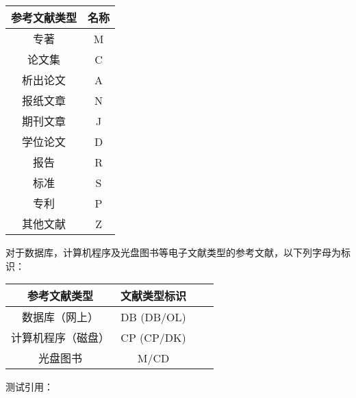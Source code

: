 \documentclass[12pt]{zjutbook}
\begin{document}
\begin{table}[htp]
  \centering
  \begin{tabular}{cc}
    \toprule
    \textbf{参考文献类型} & \textbf{名称} \\
    \midrule
    专著              & M           \\
    论文集             & C           \\
    析出论文            & A           \\
    报纸文章            & N           \\
    期刊文章            & J           \\
    学位论文            & D           \\
    报告              & R           \\
    标准              & S           \\
    专利              & P           \\
    其他文献            & Z           \\
    \bottomrule
  \end{tabular}
\end{table}

对于数据库，计算机程序及光盘图书等电子文献类型的参考文献，以下列字母为标识：
\begin{table}[htp]
  \centering
  \begin{tabular}{cccc}
    \toprule
    \textbf{参考文献类型} & \textbf{文献类型标识} \\
    \midrule
    数据库（网上）         & DB (DB/OL)      \\
    计算机程序（磁盘）       & CP (CP/DK)      \\
    光盘图书            & M/CD            \\
    \bottomrule
  \end{tabular}
\end{table}

测试引用：
\cite{zhangkun1994}
\cite{zhukezhen1973}
\cite{dupont1974bone}
\cite{zhengkaiqing1987}
\cite{jiangxizhou1980}
\cite{jianduju1994}
\cite{merkt1995rotational}
\cite{mellinger1996laser}
\cite{bixon1996dynamics}
\cite{mahui1995}
\cite{carlson1981two}
\cite{taylor1983scanning}
\cite{taylor1981study}
\cite{shimizu1983laser}
\cite{atkinson1982experimental}
\cite{kusch1975perturbations}
\cite{guangxi1993} \\
\cite{huosini1989guwu}
\cite{wangfuzhi1865songlun}
\cite{zhaoyaodong1998xinshidai}
\cite{biaozhunhua2002tushu}
\cite{chubanzhuanye2004}
\cite{who1970factors}
\cite{peebles2001probability}
\cite{baishunong1998zhiwu}
\cite{weinstein1974pathogenic}
\cite{hanjiren1985lun}
\cite{dizhi1936dizhi}
\cite{tushuguan1957tushuguanxue}
\cite{aaas1883science}
\cite{fugang2000fengsha}
\cite{xiaoyu2001chubanye}
\cite{oclc2000about}
\cite{scitor2000project}
\end{document}
